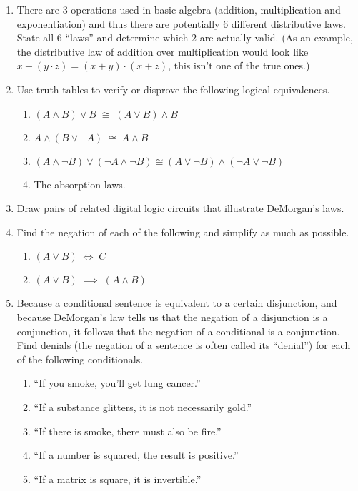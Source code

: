 \begin{enumerate}

\item There are 3 operations used in basic algebra (addition, 
multiplication and exponentiation) and thus
there are potentially 6 different distributive laws.  State
all 6 ``laws'' and determine which 2 are actually valid.
(As an example, the distributive law of addition over multiplication
would look like $x + (y \cdot z) = (x + y) \cdot (x + z)$, this isn't 
one of the true ones.) 

\item Use truth tables to verify or disprove the following 
logical equivalences.

\begin{enumerate}
\item $(A \land B) \lor B \; \cong \; (A \lor B) \land B$
\item $A \land (B \lor {\lnot}A) \; \cong \; A \land B $
\item $(A \land {\lnot}B) \lor ({\lnot}A \land {\lnot}B) \cong
(A \lor {\lnot}B) \land ({\lnot}A \lor {\lnot}B)$ 
\item The absorption laws.
\end{enumerate}

\item Draw pairs of related digital logic circuits that illustrate
DeMorgan's laws.

\item Find the negation of each of the following and simplify as much as possible.
\medskip

  \begin{enumerate}
  \item $(A \lor B) \; \iff \; C$
\medskip

  \item $(A \lor B) \; \implies \; (A \land B)$

  \end{enumerate}

\item Because a conditional sentence is equivalent to a certain disjunction, and 
because DeMorgan's law tells us that the negation of a disjunction is a conjunction,
it follows that the negation of a conditional is a conjunction.  Find denials (the negation
of a sentence is often called its ``denial'') for each of the following conditionals.

\begin{enumerate}
\item ``If you smoke, you'll get lung cancer.''
\item ``If a substance glitters, it is not necessarily gold.''
\item ``If there is smoke, there must also be fire.''
\item ``If a number is squared, the result is positive.''
\item ``If a matrix is square, it is invertible.''
\end{enumerate}


\end{enumerate}
